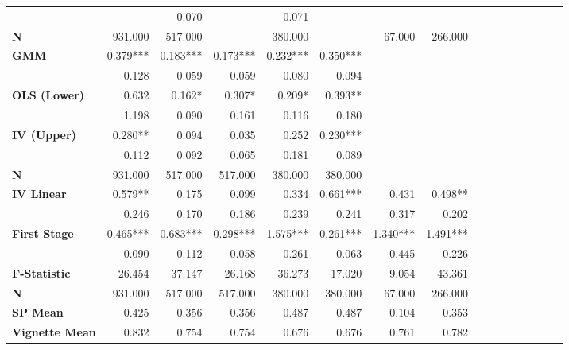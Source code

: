 \begin{tabular}{@{\extracolsep{5pt}}lrrrrrrrrrrrrrrr}
{\bf } & \phantom{***} & 0.070\phantom{***} & \phantom{***} & 0.071\phantom{***} & \phantom{***} & \phantom{***} & \phantom{***} \\
{\bf N} & 931.000\phantom{***} & 517.000\phantom{***} & \phantom{***} & 380.000\phantom{***} & \phantom{***} & 67.000\phantom{***} & 266.000\phantom{***} \\
{\bf GMM} & 0.379*** & 0.183*** & 0.173*** & 0.232*** & 0.350*** & \phantom{***} & \phantom{***} \\
{\bf } & 0.128\phantom{***} & 0.059\phantom{***} & 0.059\phantom{***} & 0.080\phantom{***} & 0.094\phantom{***} & \phantom{***} & \phantom{***} \\
{\bf OLS (Lower)} & 0.632\phantom{***} & 0.162*\phantom{**} & 0.307*\phantom{**} & 0.209*\phantom{**} & 0.393**\phantom{*} & \phantom{***} & \phantom{***} \\
{\bf } & 1.198\phantom{***} & 0.090\phantom{***} & 0.161\phantom{***} & 0.116\phantom{***} & 0.180\phantom{***} & \phantom{***} & \phantom{***} \\
{\bf IV (Upper)} & 0.280**\phantom{*} & 0.094\phantom{***} & 0.035\phantom{***} & 0.252\phantom{***} & 0.230*** & \phantom{***} & \phantom{***} \\
{\bf } & 0.112\phantom{***} & 0.092\phantom{***} & 0.065\phantom{***} & 0.181\phantom{***} & 0.089\phantom{***} & \phantom{***} & \phantom{***} \\
{\bf N} & 931.000\phantom{***} & 517.000\phantom{***} & 517.000\phantom{***} & 380.000\phantom{***} & 380.000\phantom{***} & \phantom{***} & \phantom{***} \\
{\bf IV Linear} & 0.579**\phantom{*} & 0.175\phantom{***} & 0.099\phantom{***} & 0.334\phantom{***} & 0.661*** & 0.431\phantom{***} & 0.498**\phantom{*} \\
{\bf } & 0.246\phantom{***} & 0.170\phantom{***} & 0.186\phantom{***} & 0.239\phantom{***} & 0.241\phantom{***} & 0.317\phantom{***} & 0.202\phantom{***} \\
{\bf First Stage} & 0.465*** & 0.683*** & 0.298*** & 1.575*** & 0.261*** & 1.340*** & 1.491*** \\
{\bf } & 0.090\phantom{***} & 0.112\phantom{***} & 0.058\phantom{***} & 0.261\phantom{***} & 0.063\phantom{***} & 0.445\phantom{***} & 0.226\phantom{***} \\
{\bf F-Statistic} & 26.454\phantom{***} & 37.147\phantom{***} & 26.168\phantom{***} & 36.273\phantom{***} & 17.020\phantom{***} & 9.054\phantom{***} & 43.361\phantom{***} \\
{\bf N} & 931.000\phantom{***} & 517.000\phantom{***} & 517.000\phantom{***} & 380.000\phantom{***} & 380.000\phantom{***} & 67.000\phantom{***} & 266.000\phantom{***} \\
{\bf SP Mean} & 0.425\phantom{***} & 0.356\phantom{***} & 0.356\phantom{***} & 0.487\phantom{***} & 0.487\phantom{***} & 0.104\phantom{***} & 0.353\phantom{***} \\
{\bf Vignette Mean} & 0.832\phantom{***} & 0.754\phantom{***} & 0.754\phantom{***} & 0.676\phantom{***} & 0.676\phantom{***} & 0.761\phantom{***} & 0.782\phantom{***} \\
\hline
\end{tabular}
